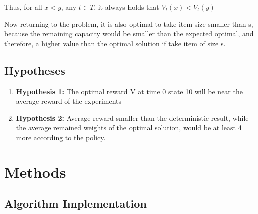 Thus, for all $x<y$, any $t \in T$, it always holds that $V_t(x)<V_t(y)$

Now returning to the problem, it is also optimal to take item size smaller than s, because the remaining capacity would be smaller than the expected optimal, and therefore, a higher value than the optimal solution if take item of size s. 

\subsection{Hypotheses}
\begin{enumerate}[label=(\roman*)]
    \item\textbf{Hypothesis 1:} The optimal reward V at time 0 state 10 will be near the average reward of the experiments
    \item\textbf{Hypothesis 2:} Average reward smaller than the deterministic result, while the average remained weights of the optimal solution, would be at least 4 more according to the policy.
\end{enumerate}

\section{Methods}

\subsection{Algorithm Implementation}

